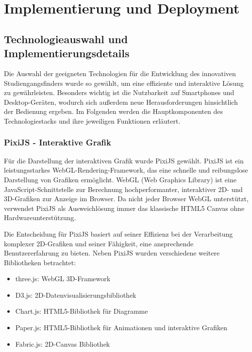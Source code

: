 \section{Implementierung und Deployment}
\subsection{Technologieauswahl und Implementierungsdetails}
Die Auswahl der geeigneten Technologien für die Entwicklung des innovativen 
Studiengangsfinders wurde so gewählt, um eine effiziente und interaktive Lösung
zu gewährleisten. Besonders wichtig ist die Nutzbarkeit auf
Smartphones und Desktop-Geräten, wodurch sich außerdem neue Herausforderungen
hinsichtlich der Bedienung ergeben. Im Folgenden werden die Hauptkomponenten des
Technologiestacks und ihre jeweiligen Funktionen erläutert.

\subsubsection{PixiJS - Interaktive Grafik}
Für die Darstellung der interaktiven Grafik wurde PixiJS gewählt. PixiJS ist ein leistungsstarkes WebGL-Rendering-Framework, das eine schnelle und reibungslose Darstellung von Grafiken ermöglicht. \parencite{pixijs_pixijs_2023} WebGL (Web Graphics Library) ist eine JavaScript-Schnittstelle zur Berechnung hochperformanter, interaktiver 2D- und 3D-Grafiken zur Anzeige im Browser. \parencite{mozilla_corporation_webgl_2023} Da nicht jeder Browser WebGL unterstützt, verwendet PixiJS als Ausweichlösung immer das klassische HTML5 Canvas ohne Hardwareunterstützung. \parencite{pixijs_pixijs_2024}

Die Entscheidung für PixiJS basiert auf seiner Effizienz bei der Verarbeitung komplexer 2D-Grafiken und seiner Fähigkeit, eine ansprechende Benutzererfahrung zu bieten. Neben PixiJS wurden verschiedene weitere Bibliotheken betrachtet:
\begin{itemize}
    \item three.js: WebGL 3D-Framework
    \item D3.js: 2D-Datenvisualisierungsbibliothek
    \item Chart.js: HTML5-Bibliothek für Diagramme
    \item Paper.js: HTML5-Bibliothek für Animationen und interaktive Grafiken
    \item Fabric.js: 2D-Canvas Bibliothek
\end{itemize}


